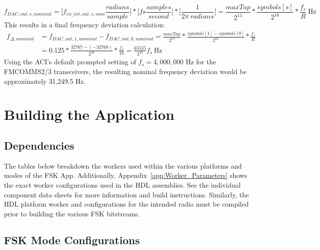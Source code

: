 	\begin{equation} \label{eq:output_freq_0}
		f_{DAC,out,s,nominal} = \Bigg[ f_{cic\_int,out,s,nom} \frac{radians}{sample} \Bigg] * \Bigg[ fs \frac{samples}{second} \Bigg] * \Bigg[ \frac{1}{2\pi \ radians} \Bigg] = \frac{maxTap}{2^{15}} * \frac{symbols[s]}{2^{16}} * \frac{f_s}{R} \ \text{Hz}
	\end{equation}
This results in a final frequency deviation calculation:
	\begin{align*} \label{eq:freq_deviation}
		f_{\Delta,nominal} &= f_{DAC,out,1,nominal} - f_{DAC,out,0,nominal}
		= \frac{maxTap}{2^{15}} * \frac{symbols[1]-symbols[0]}{2^{16}} * \frac{f_s}{R} \\
		&= 0.125 * \frac{32767 - (-32768)}{2^{16}} * \frac{f_s}{16}
		= \frac{65535}{2^{23}} f_s \ \text{Hz}
	\end{align*}
Using the ACI's default prompted setting of $f_s=4,000,000$ Hz for the FMCOMMS2/3 transceivers, the resulting nominal frequency deviation would be approximately 31,249.5 Hz.

\newpage
\section{Building the Application}
\subsection{Dependencies}
The tables below breakdown the workers used within the various platforms and modes of the FSK App. Additionally, Appendix~\ref{app:Worker_Parameters} shows the exact worker configurations used in the HDL assemblies. See the individual component data sheets for more information and build instructions. Similarly, the HDL platform worker and configurations for the intended radio must be compiled prior to building the various FSK bitstreams.
\subsection{FSK Mode Configurations}
	\newcommand{\checkrow}[7]{{#1} &
		\ifthenelse{ \equal{#2}{ } }{}{\ding{51}} &
		\ifthenelse{ \equal{#3}{ } }{}{\ding{51}} &
		\ifthenelse{ \equal{#4}{ } }{}{\ding{51}} &
		\ifthenelse{ \equal{#5}{ } }{}{\ding{51}} &
		\ifthenelse{ \equal{#6}{ } }{}{\ding{51}} &
		\ifthenelse{ \equal{#7}{ } }{}{\ding{51}}\\ \hline}
